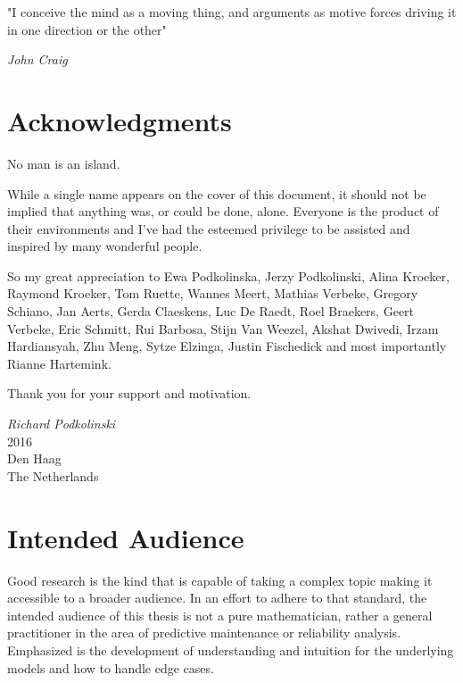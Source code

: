 \thispagestyle{empty}
\vspace*{20px}
\begin{displayquote}
"I conceive the mind as a moving thing, and arguments as motive forces driving it in one direction or the other" 
\end{displayquote}

\begin{flushright}
\textit{John Craig}
\end{flushright}

\vspace*{25px}

\section*{Acknowledgments}

No man is an island.

While a single name appears on the cover of this document, it should not be implied that anything was, or could be done, alone. Everyone is the product of their environments and I've had the esteemed privilege to be assisted and inspired by many wonderful people. 

So my great appreciation to Ewa Podkolinska, Jerzy Podkolinski, Alina Kroeker, Raymond Kroeker, Tom Ruette, Wannes Meert, Mathias Verbeke, Gregory Schiano, Jan Aerts, Gerda Claeskens, Luc De Raedt, Roel Braekers, Geert Verbeke, Eric Schmitt, Rui Barbosa, Stijn Van Weezel, Akshat Dwivedi, Irzam Hardiansyah, Zhu Meng, Sytze Elzinga, Justin Fischedick and most importantly Rianne Hartemink.

Thank you for your support and motivation. 

\begin{flushright}
\textit{Richard Podkolinski}
\\
2016 
\\
Den Haag
\\
The Netherlands
\end{flushright}

\vspace*{25px}

\section*{Intended Audience}

Good research is the kind that is capable of taking a complex topic making it accessible to a broader audience. In an effort to adhere to that standard, the intended audience of this thesis is not a pure mathematician, rather a general practitioner in the area of predictive maintenance or reliability analysis. Emphasized is the development of understanding and intuition for the underlying models and how to handle edge cases. 

